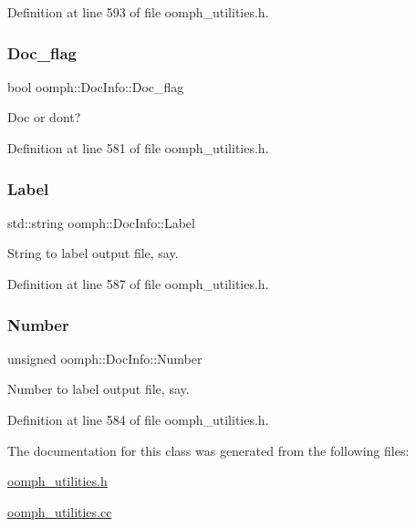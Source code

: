 Definition at line 593 of file oomph\+\_\+utilities.\+h.

\mbox{\label{classoomph_1_1DocInfo_a23ed6ad5b2eab46c918155b79c03e098}} 
\subsubsection{\texorpdfstring{Doc\+\_\+flag}{Doc\_flag}}
{\footnotesize\ttfamily bool oomph\+::\+Doc\+Info\+::\+Doc\+\_\+flag\hspace{0.3cm}{\ttfamily [private]}}



Doc or don\textquotesingle{}t? 



Definition at line 581 of file oomph\+\_\+utilities.\+h.

\mbox{\label{classoomph_1_1DocInfo_ad2bbc402589152ebb55c448a6272f469}} 
\subsubsection{\texorpdfstring{Label}{Label}}
{\footnotesize\ttfamily std\+::string oomph\+::\+Doc\+Info\+::\+Label\hspace{0.3cm}{\ttfamily [private]}}



String to label output file, say. 



Definition at line 587 of file oomph\+\_\+utilities.\+h.

\mbox{\label{classoomph_1_1DocInfo_a184ec7b9fb261d77014f5203c8dbef75}} 
\subsubsection{\texorpdfstring{Number}{Number}}
{\footnotesize\ttfamily unsigned oomph\+::\+Doc\+Info\+::\+Number\hspace{0.3cm}{\ttfamily [private]}}



Number to label output file, say. 



Definition at line 584 of file oomph\+\_\+utilities.\+h.



The documentation for this class was generated from the following files\+:\begin{DoxyCompactItemize}
\item 
\hyperlink{oomph__utilities_8h}{oomph\+\_\+utilities.\+h}\item 
\hyperlink{oomph__utilities_8cc}{oomph\+\_\+utilities.\+cc}\end{DoxyCompactItemize}
